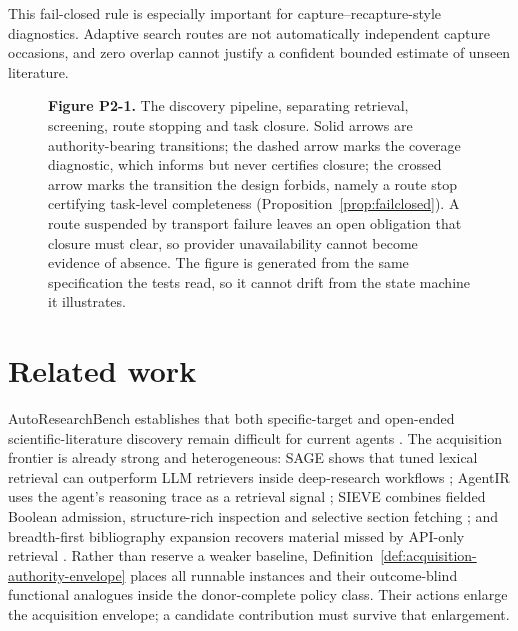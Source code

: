 \documentclass[11pt]{article}
\theoremstyle{definition}
\begin{document}
This fail-closed rule is especially important for capture--recapture-style diagnostics. Adaptive search routes are not automatically independent capture occasions, and zero overlap cannot justify a confident bounded estimate of unseen literature.





\begin{figure}[t]
\centering

\caption{\textbf{Figure P2-1.} The discovery pipeline, separating retrieval,
screening, route stopping and task closure. Solid arrows are authority-bearing
transitions; the dashed arrow marks the coverage diagnostic, which informs but
never certifies closure; the crossed arrow marks the transition the design
forbids, namely a route stop certifying task-level completeness
(Proposition~\ref{prop:failclosed}). A route suspended by transport failure
leaves an open obligation that closure must clear, so provider unavailability
cannot become evidence of absence. The figure is generated from the same
specification the tests read, so it cannot drift from the state machine it
illustrates.}
\label{fig:p2-1}
\end{figure}







\section{Related work}
AutoResearchBench establishes that both specific-target and open-ended
scientific-literature discovery remain difficult for current agents
\cite{autoresearchbench2026}.  The acquisition frontier is already strong and
heterogeneous: SAGE shows that tuned lexical retrieval can outperform LLM
retrievers inside deep-research workflows \cite{sage2026}; AgentIR uses the
agent's reasoning trace as a retrieval signal \cite{agentir2026}; SIEVE combines
fielded Boolean admission, structure-rich inspection and selective section
fetching \cite{sieve2026}; and breadth-first bibliography expansion recovers
material missed by API-only retrieval \cite{rethinkinglitsearch2026}.  Rather
than reserve a weaker baseline,
Definition~\ref{def:acquisition-authority-envelope} places all runnable instances and
their outcome-blind functional analogues inside the donor-complete policy class.
Their actions enlarge the acquisition envelope; a candidate contribution must
survive that enlargement.
\end{document}
